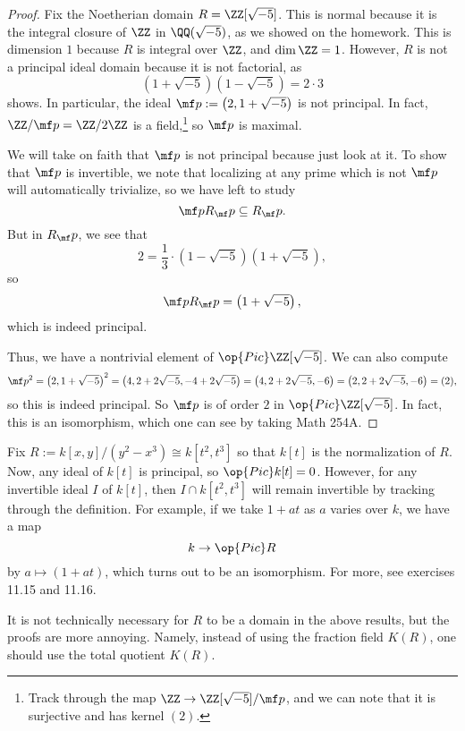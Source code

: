 \documentclass[../notes.tex]{subfiles}
\begin{document}
\begin{proof}
	Fix the Noetherian domain $R=\ZZ[\sqrt{-5}]$. This is normal because it is the integral closure of $\ZZ$ in $\QQ(\sqrt{-5})$, as we showed on the homework. This is dimension $1$ because $R$ is integral over $\ZZ$, and $\dim\ZZ=1$. However, $R$ is not a principal ideal domain because it is not factorial, as
	\[\left(1+\sqrt{-5}\right)\left(1-\sqrt{-5}\right)=2\cdot3\]
	shows. In particular, the ideal $\mf p:=\left(2,1+\sqrt{-5}\right)$ is not principal. In fact, $\ZZ/\mf p=\ZZ/2\ZZ$ is a field,\footnote{Track through the map $\ZZ\to\ZZ[\sqrt{-5}]/\mf p$, and we can note that it is surjective and has kernel $(2)$.} so $\mf p$ is maximal.

	We will take on faith that $\mf p$ is not principal because just look at it. To show that $\mf p$ is invertible, we note that localizing at any prime which is not $\mf p$ will automatically trivialize, so we have left to study
	\[\mf pR_\mf p\subseteq R_\mf p.\]
	But in $R_\mf p$, we see that
	\[2=\frac13\cdot\left(1-\sqrt{-5}\right)\left(1+\sqrt{-5}\right),\]
	so
	\[\mf pR_\mf p=\left(1+\sqrt{-5}\right),\]
	which is indeed principal.

	Thus, we have a nontrivial element of $\op{Pic}\ZZ[\sqrt{-5}]$. We can also compute
	\[\mf p^2=\left(2,1+\sqrt{-5}\right)^2=\left(4,2+2\sqrt{-5},-4+2\sqrt{-5}\right)=\left(4,2+2\sqrt{-5},-6\right)=\left(2,2+2\sqrt{-5},-6\right)=(2),\]
	so this is indeed principal. So $\mf p$ is of order $2$ in $\op{Pic}\ZZ[\sqrt{-5}]$. In fact, this is an isomorphism, which one can see by taking Math 254A.
\end{proof}
\begin{ex}
	Fix $R:=k[x,y]/\left(y^2-x^3\right)\cong k\left[t^2,t^3\right]$ so that $k[t]$ is the normalization of $R$. Now, any ideal of $k[t]$ is principal, so $\op{Pic}k[t]=0$. However, for any invertible ideal $I$ of $k[t]$, then $I\cap k\left[t^2,t^3\right]$ will remain invertible by tracking through the definition. For example, if we take $1+at$ as $a$ varies over $k$, we have a map
	\[k\to\op{Pic}R\]
	by $a\mapsto(1+at)$, which turns out to be an isomorphism. For more, see exercises 11.15 and 11.16.
\end{ex}
\begin{remark}
	It is not technically necessary for $R$ to be a domain in the above results, but the proofs are more annoying. Namely, instead of using the fraction field $K(R)$, one should use the total quotient $K(R)$.
\end{remark}
\end{document}
